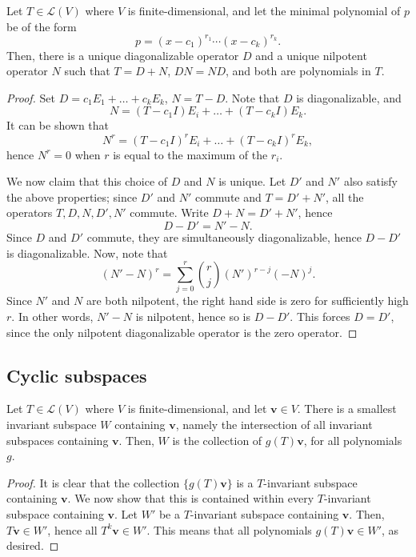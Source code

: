 \documentclass[11pt]{article}
\renewcommand{\vec}[1]{\boldsymbol{#1}}
\newcommand{\vv}{\vec{v}}
\newcommand{\alg}[1]{\mathscr{#1}}
\newcommand{\algL}{\alg{L}}
\theoremstyle{definition}
\theoremstyle{remark}
\numberwithin{equation}{section}
\begin{document}
    \begin{theorem}
        Let $T \in \algL(V)$ where $V$ is finite-dimensional, and let the minimal
        polynomial of $p$ be of the form \[
            p = (x - c_1)^{r_1} \cdots (x - c_k)^{r_k}.
        \] Then, there is a unique diagonalizable operator $D$ and a unique nilpotent
        operator $N$ such that $T = D + N$, $DN = ND$, and both are polynomials in
        $T$.
    \end{theorem}
    \begin{proof}
        Set $D = c_1E_1 + \dots + c_kE_k$, $N = T - D$. Note that $D$ is
        diagonalizable, and \[
            N = (T - c_1I)E_i + \dots + (T - c_kI)E_k.
        \] It can be shown that \[
            N^r = (T - c_1I)^rE_i + \dots + (T - c_kI)^rE_k,
        \] hence $N^r = 0$ when $r$ is equal to the maximum of the $r_i$.

        We now claim that this choice of $D$ and $N$ is unique. Let $D'$ and $N'$
        also satisfy the above properties; since $D'$ and $N'$ commute and $T = D' +
        N'$, all the operators $T, D, N, D', N'$ commute. Write $D + N = D' + N'$,
        hence \[
            D - D' = N' - N.
        \] Since $D$ and $D'$ commute, they are simultaneously diagonalizable, hence
        $D - D'$ is diagonalizable. Now, note that \[
            (N' - N)^r = \sum_{j = 0}^r \binom{r}{j} (N')^{r - j}(-N)^{j}.
        \] Since $N'$ and $N$ are both nilpotent, the right hand side is zero for
        sufficiently high $r$. In other words, $N' - N$ is nilpotent, hence so is $D
        - D'$. This forces $D = D'$, since the only nilpotent diagonalizable operator
        is the zero operator.
    \end{proof}

    \subsection{Cyclic subspaces}
    \begin{lemma}
        Let $T \in \algL(V)$ where $V$ is finite-dimensional, and let $\vv \in V$.
        There is a smallest invariant subspace $W$ containing $\vv$, namely the
        intersection of all invariant subspaces containing $\vv$. Then, $W$ is the
        collection of $g(T)\vv$, for all polynomials $g$.
    \end{lemma}
    \begin{proof}
        It is clear that the collection $\{g(T) \vv\}$ is a $T$-invariant
        subspace containing $\vv$. We now show that this is contained within every
        $T$-invariant subspace containing $\vv$. Let $W'$ be a $T$-invariant subspace
        containing $\vv$. Then, $T\vv \in W'$, hence all $T^k\vv \in W'$. This means
        that all polynomials $g(T)\vv \in W'$, as desired.
    \end{proof}
\end{document}
